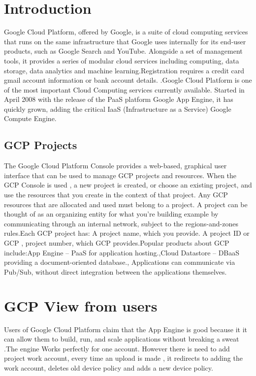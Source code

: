 \documentclass[10pt,]{article}
\begin{document}
\newpage

\section{Introduction}
Google Cloud Platform, offered by Google, is a suite of cloud computing services that runs on the same infrastructure that Google uses internally for its end-user products, such as Google Search and YouTube.\cite{s1} Alongside a set of management tools, it provides a series of modular cloud services including computing, data storage, data analytics and machine learning.\cite{s2}Registration requires a credit card gmail account information or bank account details. \cite{s3}.Google Cloud Platform is one of the most important Cloud Computing services currently available. Started in April 2008 with the release of the PaaS platform Google App Engine, it has quickly grown, adding the critical IaaS (Infrastructure as a Service) Google Compute Engine. 
\subsection{GCP Projects}
The Google Cloud Platform Console provides a web-based, graphical user interface that  can be used to manage  GCP projects and resources. When the GCP Console is used ,  a new project is created, or choose an existing project, and use the resources that you create in the context of that project. Any GCP resources that are allocated and used must belong to a project. A project can be thought of as an organizing entity for what you're building example by communicating through an internal network, subject to the regions-and-zones rules.Each GCP project has: A project name, which you provide. A project ID or GCP , project number, which GCP provides.Popular products about GCP include:App Engine – PaaS for application hosting.\cite{s15},Cloud Datastore – DBaaS providing a document-oriented database.\cite{s8}, Applications can communicate via Pub/Sub, without direct integration between the applications themselves.\cite{s5}
\section{ GCP View from users}
Users of Google Cloud Platform claim that the  App Engine is good because it it can allow them to  build, run, and scale applications without breaking a sweat \cite{s12}.The engine Works perfectly for one account. However there is need to add project work account, every time an upload is made , it redirects  to adding the work account, deletes old device policy and adds a new device policy.
\end{document}
